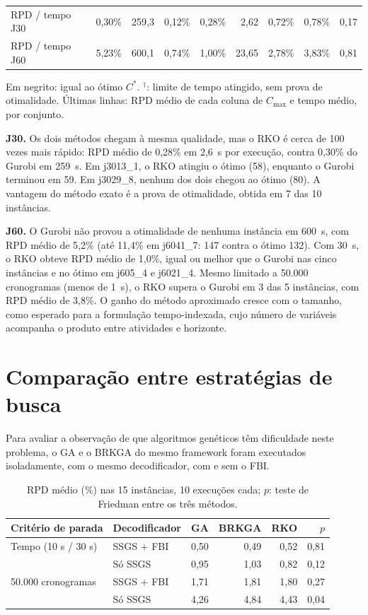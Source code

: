 \documentclass[11pt,a4paper]{article}
\newcommand{\cmax}{C_{\max}}
\begin{document}
\begin{table}[ht]
\begin{tabular}{lrrrrrrrrr}
\midrule
RPD / tempo J30 & & 0,30\% & 259,3 & 0,12\% & 0,28\% & 2,62 & 0,72\% & 0,78\% & 0,17 \\
RPD / tempo J60 & & 5,23\% & 600,1 & 0,74\% & 1,00\% & 23,65 & 2,78\% & 3,83\% & 0,81 \\
\bottomrule
\end{tabular}
\par\smallskip
\begin{minipage}{0.97\textwidth}\footnotesize
Em negrito: igual ao ótimo $C^*$. $^\dagger$: limite de tempo atingido, sem prova de otimalidade.
Últimas linhas: RPD médio de cada coluna de $\cmax$ e tempo médio, por conjunto.
\end{minipage}
\end{table}

\textbf{J30.} Os dois métodos chegam à mesma qualidade, mas o RKO é cerca de 100 vezes mais
rápido: RPD médio de 0,28\% em 2,6~s por execução, contra 0,30\% do Gurobi em 259~s. Em j3013\_1,
o RKO atingiu o ótimo (58), enquanto o Gurobi terminou em 59. Em j3029\_8, nenhum dos dois
chegou ao ótimo (80). A vantagem do método exato é a prova de otimalidade, obtida em 7 das 10
instâncias.

\textbf{J60.} O Gurobi não provou a otimalidade de nenhuma instância em 600~s, com RPD médio de
5,2\% (até 11,4\% em j6041\_7: 147 contra o ótimo 132). Com 30~s, o RKO obteve RPD médio de 1,0\%,
igual ou melhor que o Gurobi nas cinco instâncias e no ótimo em j605\_4 e j6021\_4. Mesmo limitado
a 50.000 cronogramas (menos de 1~s), o RKO supera o Gurobi em 3 das 5 instâncias, com RPD médio de
3,8\%. O ganho do método aproximado cresce com o tamanho, como esperado para a formulação
tempo-indexada, cujo número de variáveis acompanha o produto entre atividades e horizonte.

\section*{Comparação entre estratégias de busca}

Para avaliar a observação de que algoritmos genéticos têm dificuldade neste problema, o GA e o
BRKGA \cite{brkga} do mesmo framework foram executados isoladamente, com o mesmo decodificador,
com e sem o FBI.

\begin{table}[ht]
\centering
\small
\caption{RPD médio (\%) nas 15 instâncias, 10 execuções cada; $p$: teste de Friedman entre os três métodos.}
\label{tab:busca}
\begin{tabular}{llrrrr}
\toprule
Critério de parada & Decodificador & GA & BRKGA & RKO & $p$ \\
\midrule
Tempo (10 s / 30 s) & SSGS + FBI & 0,50 & 0,49 & 0,52 & 0,81 \\
                    & Só SSGS    & 0,95 & 1,03 & 0,82 & 0,12 \\
50.000 cronogramas  & SSGS + FBI & 1,71 & 1,81 & 1,80 & 0,27 \\
                    & Só SSGS    & 4,26 & 4,84 & 4,43 & 0,04 \\
\bottomrule
\end{tabular}
\end{table}
\end{document}
